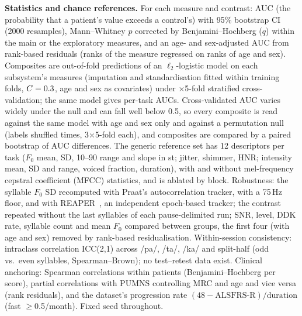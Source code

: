 \documentclass{article}
\begin{document}
\textbf{Statistics and chance references.} For each measure and contrast: AUC (the probability that a patient's value exceeds a control's) with 95\% bootstrap CI (2000 resamples), Mann--Whitney $p$ corrected by Benjamini--Hochberg ($q$) within the \nFeat{} main or the \nExt{} exploratory measures, and an age- and sex-adjusted AUC from rank-based residuals (ranks of the measure regressed on ranks of age and sex). Composites are out-of-fold predictions of an $\ell_2$-logistic model on each subsystem's measures (imputation and standardisation fitted within training folds, $C=0.3$, age and sex as covariates) under \nRep$\times$5-fold stratified cross-validation; the same model gives per-task AUCs. Cross-validated AUC varies widely under the null and can fall well below 0.5, so every composite is read against the same model with age and sex only and against a permutation null (labels shuffled \permN{} times, 3$\times$5-fold each), and composites are compared by a paired bootstrap of AUC differences. The generic reference set has 12 descriptors per task ($F_0$ mean, SD, 10--90 range and slope in st; jitter, shimmer, HNR; intensity mean, SD and range, voiced fraction, duration), with and without mel-frequency cepstral coefficient (MFCC) statistics, and is ablated by block. Robustness: the syllable $F_0$ SD recomputed with Praat's autocorrelation tracker, with a 75\,Hz floor, and with REAPER~\cite{talkin2015reaper}, an independent epoch-based tracker; the contrast repeated without the last \rDropLast{} syllables of each pause-delimited run; SNR, level, DDK rate, syllable count and mean $F_0$ compared between groups, the first four (with age and sex) removed by rank-based residualisation. Within-session consistency: intraclass correlation ICC(2,1) across /pa/, /ta/, /ka/ and split-half (odd vs.\ even syllables, Spearman--Brown); no test--retest data exist. Clinical anchoring: Spearman correlations within patients (Benjamini--Hochberg per score), partial correlations with PUMNS controlling MRC and age and vice versa (rank residuals), and the dataset's progression rate $(48-\mathrm{ALSFRS\text{-}R})/\mathrm{duration}$ (fast $\geq$0.5/month). Fixed seed throughout.
\end{document}
